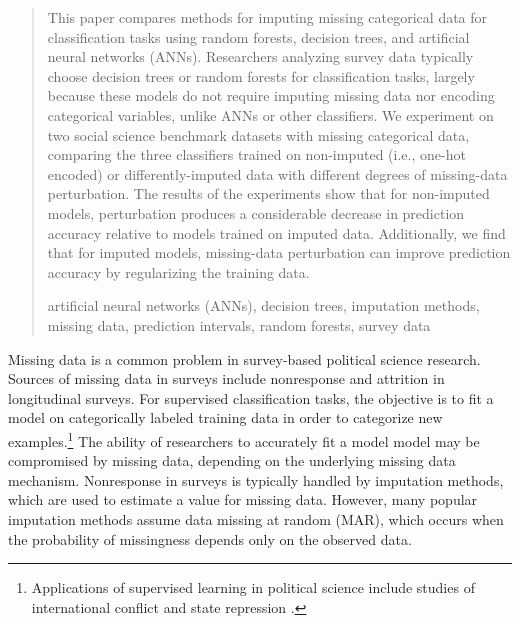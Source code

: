 \documentclass[10pt]{book}
\theoremstyle{definition}
\begin{document}
\begin{quotation}
This paper compares methods for imputing missing categorical data for classification tasks using random forests, decision trees, and artificial neural networks (ANNs). Researchers analyzing survey data typically choose decision trees or random forests for classification tasks, largely because these models do not require imputing missing data nor encoding categorical variables, unlike ANNs or other classifiers. We experiment on two social science benchmark datasets with missing categorical data, comparing the three classifiers trained on non-imputed (i.e., one-hot encoded) or differently-imputed data with different degrees of missing-data perturbation. The results of the experiments show that for non-imputed models, perturbation produces a considerable decrease in prediction accuracy relative to models trained on imputed data. Additionally, we find that for imputed models, missing-data perturbation can improve prediction accuracy by regularizing the training data. \par

\vspace{9pt}
artificial neural networks (ANNs), decision trees,  imputation methods, missing data,  prediction intervals, random forests, survey data
\par
\end{quotation}\par



\def\thefigure{\arabic{figure}}
\def\thetable{\arabic{table}}

\fontsize{12}{14pt plus.8pt minus .6pt}\selectfont

\newpage %

\setcounter{chapter}{1}
\setcounter{equation}{0} %
\setcounter{page}{1} %

Missing data is a common problem in survey-based political science research. Sources of missing data in surveys include nonresponse and attrition in longitudinal surveys. For supervised classification tasks, the objective is to fit a model on categorically labeled training data in order to categorize new examples.\footnote{Applications of supervised learning in political science include studies of international conflict and state repression \citep{beck2000,de2004,hill2014}.} The ability of researchers to accurately fit a model model may be compromised by missing data, depending on the underlying missing data mechanism. Nonresponse in surveys is typically handled by imputation methods, which are used to estimate a value for missing data. However, many popular imputation methods assume data missing at random (MAR), which occurs when the probability of missingness depends only on the observed data. 
\end{document}
